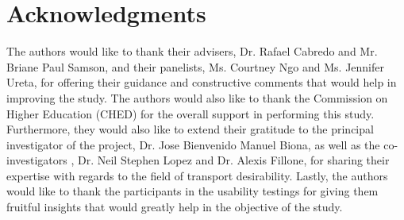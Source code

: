 \documentclass{sigchi}
\begin{document}


\section{Acknowledgments}

The authors would like to thank their advisers, Dr. Rafael Cabredo and Mr. Briane Paul Samson, and their panelists, Ms. Courtney Ngo and Ms. Jennifer Ureta, for offering their guidance and constructive comments that would help in improving the study. The authors would also like to thank the Commission on Higher Education (CHED) for the overall support in performing this study. Furthermore, they would also like to extend their gratitude to the principal investigator of the project, Dr. Jose Bienvenido Manuel Biona, as well as the co-investigators , Dr. Neil Stephen Lopez and Dr. Alexis Fillone, for sharing their expertise with regards to the field of transport desirability. Lastly, the authors would like to thank the participants in the usability testings for giving them fruitful insights that would greatly help in the objective of the study.

%
%
%
%
%
\balance{}
\end{document}
